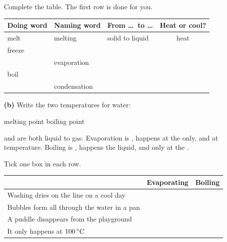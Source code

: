 \documentclass[12pt,a4paper]{article}
\begin{document}
\noindent Complete the table. The first row is done for you.

\vspace{7pt}
\noindent
\begin{tabularx}{\textwidth}{|p{2.9cm}|p{3.2cm}|X|c|}
  \hline
  \textbf{Doing word} & \textbf{Naming word} & \textbf{From \ldots\ to \ldots} &
  \textbf{Heat or cool?} \\
  \hline
  melt \rule[-0.65em]{0pt}{2.0em}  & melting & solid to liquid & heat \\ \hline
  freeze \rule[-0.65em]{0pt}{2.0em} & & & \\ \hline
   \rule[-0.65em]{0pt}{2.0em} & evaporation & & \\ \hline
  boil \rule[-0.65em]{0pt}{2.0em}  & & & \\ \hline
   \rule[-0.65em]{0pt}{2.0em} & condensation & & \\ \hline
\end{tabularx}

\vspace{9pt}
\noindent \textbf{(b)} Write the two temperatures for water:

\smallskip
\noindent melting point \blank[3.0cm] \qquad boiling point \blank[3.0cm]


\begin{remember}
   and  are both liquid to gas. Evaporation is
  , happens at the  only, and at  temperature.
  Boiling is , happens  the liquid, and only at the
  .
\end{remember}

\noindent Tick one box in each row.

\vspace{6pt}
\noindent
\begin{tabularx}{\textwidth}{|X|c|c|}
  \hline
  & \textbf{Evaporating} & \textbf{Boiling} \\
  \hline
  Washing dries on the line on a cool day \rule[-0.65em]{0pt}{2.0em} & & \\ \hline
  Bubbles form all through the water in a pan \rule[-0.65em]{0pt}{2.0em} & & \\ \hline
  A puddle disappears from the playground \rule[-0.65em]{0pt}{2.0em} & & \\ \hline
  It only happens at $100\,^{\circ}\mathrm{C}$ \rule[-0.65em]{0pt}{2.0em} & & \\ \hline
\end{tabularx}
\end{document}
